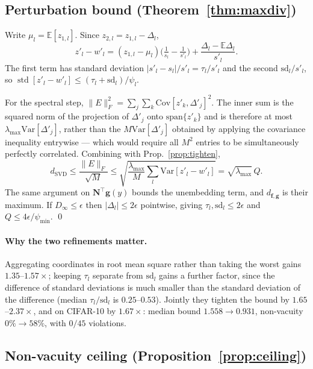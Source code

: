 \documentclass[10pt,letterpaper,twocolumn]{article}
\newcommand{\bff}{\mathbf{f}}
\newcommand{\bfg}{\mathbf{g}}
\newcommand{\bfN}{\mathbf{N}}
\newcommand{\dSVD}{d_{\mathrm{SVD}}}
\newcommand{\dfg}{d_{\bff,\bfg}}
\newcommand{\Dinf}{D_{\infty}}
\newcommand{\Var}{\mathrm{Var}}
\newcommand{\Cov}{\mathrm{Cov}}
\theoremstyle{plain}
\theoremstyle{definition}
\theoremstyle{remark}
\begin{document}
\subsection{Perturbation bound (Theorem~\ref{thm:maxdiv})}

Write $\mu_{l}=\mathbb{E}[z_{1,l}]$. Since $z_{2,l}=z_{1,l}-\Delta_{l}$,
\[
z'_{l}-w'_{l}
=(z_{1,l}-\mu_{l})\Big(\tfrac1{s_{l}}-\tfrac1{s'_{l}}\Big)
+\frac{\Delta_{l}-\mathbb{E}\Delta_{l}}{s'_{l}}.
\]
The first term has standard deviation $|s'_{l}-s_{l}|/s'_{l}=\tau_{l}/s'_{l}$
and the second $\mathrm{sd}_{l}/s'_{l}$, so
$\operatorname{std}[z'_{l}-w'_{l}]\le(\tau_{l}+\mathrm{sd}_{l})/\psi_{l}$.

For the spectral step, $\|E\|_{F}^{2}=\sum_{j}\sum_{k}\Cov[z'_{k},\Delta'_{j}]^{2}$.
The inner sum is the squared norm of the projection of $\Delta'_{j}$ onto
$\mathrm{span}\{z'_{k}\}$ and is therefore at most
$\lambda_{\max}\Var[\Delta'_{j}]$, rather than the $M\Var[\Delta'_{j}]$ obtained
by applying the covariance inequality entrywise --- which would require all
$M^{2}$ entries to be simultaneously perfectly correlated. Combining with
Prop.~\ref{prop:tighten},
\[
\dSVD\le\frac{\|E\|_{F}}{\sqrt{M}}
\le\sqrt{\frac{\lambda_{\max}}{M}\sum_{l}\Var[z'_{l}-w'_{l}]}
=\sqrt{\lambda_{\max}}\,Q .
\]
The same argument on $\bfN^{\top}\bfg(y)$ bounds the unembedding term, and
$\dfg$ is their maximum. If $\Dinf\le\epsilon$ then
$|\Delta_{l}|\le2\epsilon$ pointwise, giving $\tau_{l},\mathrm{sd}_{l}\le2\epsilon$
and $Q\le4\epsilon/\psi_{\min}$. \qed

\paragraph{Why the two refinements matter.}
Aggregating coordinates in root mean square rather than taking the worst gains
$1.35$--$1.57\times$; keeping $\tau_{l}$ separate from $\mathrm{sd}_{l}$ gains a
further factor, since the difference of standard deviations is much smaller than
the standard deviation of the difference (median $\tau_{l}/\mathrm{sd}_{l}$ is
$0.25$--$0.53$). Jointly they tighten the bound by $1.65$--$2.37\times$, and on
CIFAR-10 by $1.67\times$: median bound $1.558\to0.931$, non-vacuity
$0\%\to58\%$, with $0/45$ violations.

\subsection{Non-vacuity ceiling (Proposition~\ref{prop:ceiling})}
\end{document}
